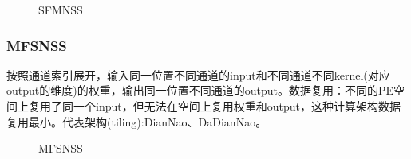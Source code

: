 \documentclass[UTF8]{scrartcl}
\begin{document}
		  		 \begin{figure}[h]
		  		  		  	\centering
		  		  		  	\caption{SFMNSS}
		  		  		  	\label{fig4}
		  		  \end{figure}		  
		  
		  \subsubsection{MFSNSS}
	      按照通道索引展开，输入同一位置不同通道的input和不同通道不同kernel(对应output的维度)的权重，输出同一位置不同通道的output。数据复用：不同的PE空间上复用了同一个input，但无法在空间上复用权重和output，这种计算架构数据复用最小。代表架构(tiling):DianNao\cite{diannap}、DaDianNao\cite{dadiannao}。
	      
	      		  		  \begin{figure}[h]
	      		  		  	\centering
	      		  		  	\caption{MFSNSS}
	      		  		  	\label{fig5}
	      		  		  \end{figure}
	      
\end{document}
